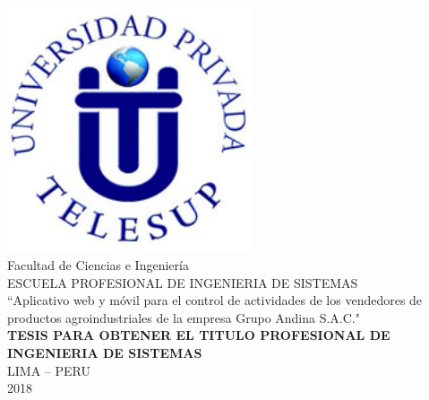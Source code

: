 \begin{center}	
\includegraphics[width=7.2cm]{UPTLogo.jpg} \\[1 cm]
\huge Facultad de Ciencias e Ingeniería \\[0.5 cm]
\Large ESCUELA PROFESIONAL DE INGENIERIA DE SISTEMAS\\[1 cm]
\Large ``Aplicativo web y móvil para el control de actividades de los vendedores de productos agroindustriales de la empresa Grupo Andina S.A.C."\\[1 cm]
\Large \textbf{TESIS PARA OBTENER  EL TITULO PROFESIONAL DE INGENIERIA DE SISTEMAS}\\[0.5 cm]
\large LIMA – PERU\\
\large 2018
\end{center}